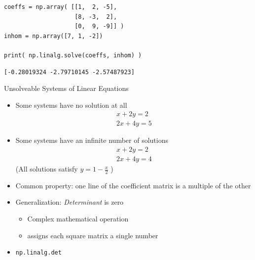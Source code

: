 \begin{frame}[fragile]
%
\begin{codebox}
\begin{verbatim}
coeffs = np.array( [[1,  2, -5],
                    [8, -3,  2],
                    [0,  9, -9]] )
inhom = np.array([7, 1, -2])

print( np.linalg.solve(coeffs, inhom) )
\end{verbatim}
\end{codebox}
%
\begin{cmdbox}
\begin{verbatim}
[-0.28019324 -2.79710145 -2.57487923]
\end{verbatim}
\end{cmdbox}
%
\end{frame}


\begin{frame}[fragile]{Unsolveable Systems of Linear Equations}
%
\begin{itemize}
\item Some systems have no solution at all
	\vspace{-12pt}
	\begin{align*}
		x + 2y = 2 \\
		2x + 4y = 5
	\end{align*}
\item Some systems have an infinite number of solutions
	\vspace{-12pt}
	\begin{align*}
		x + 2y = 2 \\
		2x + 4y = 4
	\end{align*}
	\vspace{-12pt}
	(All solutions satisfy $y = 1 - \frac{x}{2}$
	\vspace{14pt})
\item Common property: one line of the coefficient matrix is a multiple of the other
\item Generalization: \emph{Determinant} is zero
	\begin{itemize}
	\item Complex mathematical operation
	\item assigns each square matrix a single number
	\end{itemize}
\item \texttt{np.linalg.det}
\end{itemize}
%
\end{frame}

